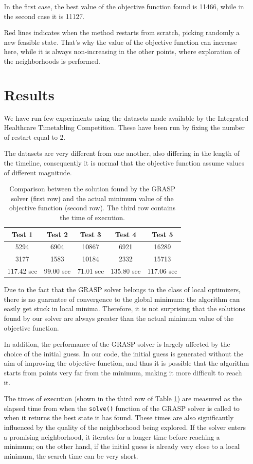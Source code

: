 \documentclass{article}
\begin{document}
In the first case, the best value of the objective function found is 11466, while in the second case it is 11127.

Red lines indicates when the method restarts from scratch, picking randomly a new feasible state. That's why the 
value of the objective function can increase here, while it is always non-increasing in the other points, where exploration of the 
neighborhoods is performed.

\section{Results}
We have run few experiments using the datasets made available by the Integrated Healthcare Timetabling Competition. 
These have been run by fixing the number of restart equal to $2$.

The datasets are very different from one another, also differing in the length of the timeline, consequently it is normal that the objective function assume values of different magnitude.

\begin{table}[h!]
    \centering
    \begin{tabular}{|c|c|c|c|c|}
        \hline
        \textbf{Test 1} & \textbf{Test 2} & \textbf{Test 3} & \textbf{Test 4} & \textbf{Test 5}  \\ \hline
        5294 & 6904 & 10867 & 6921 & 16289   \\ \hline
        3177 & 1583 & 10184 & 2332 & 15713  \\ \hline
        117.42 sec & 99.00 sec & 71.01 sec & 135.80 sec & 117.06 sec \\ \hline
    \end{tabular}
    \caption{Comparison between the solution found by the GRASP solver (first row) and the actual minimum value of the objective function (second row). The third row contains the time of execution.}
    \label{table:risultati}
\end{table}

Due to the fact that the GRASP solver belongs to the class of local optimizers, there is no guarantee of convergence to the global minimum: the algorithm can easily get stuck in local minima. Therefore, it is not surprising that the solutions found by our solver are always greater than the actual minimum value of the objective function.

In addition, the performance of the GRASP solver is largely affected by the choice of the initial guess. In our code, the initial guess is generated without the aim of improving the objective function, and thus it is possible that the algorithm starts from points very far from the minimum, making it more difficult to reach it.

The times of execution (shown in the third row of Table \ref{table:risultati}) are measured as the elapsed time from when the \verb+solve()+ function of the GRASP solver is called to when it returns the best state it has found. 
These times are also significantly influenced by the quality of the neighborhood being explored. If the solver enters a promising neighborhood, it iterates for a longer time before reaching a minimum; on the other hand, if the initial guess is already very close to a local minimum, the search time can be very short.
\end{document}
